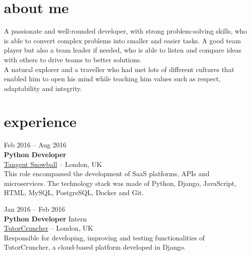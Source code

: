 \documentclass[]{friggeri-cv}
\begin{document}
\section{about me}
{
A passionate and well-rounded developer, with strong problem-solving skills, who is able to convert complex problems into smaller and easier tasks. A good team player but also a team leader if needed, who is able to listen and compare ideas with others to drive teams to better solutions.
\\
A natural explorer and a traveller who had met lots of different cultures that enabled him to open his mind while teaching him values such as respect, adaptability and integrity.}


\section{experience}

{Feb 2016 -- Aug 2016} \\
{\textbf{Python Developer}} \\
{\href{http://www.tangentsnowball.com}{Tangent Snowball}} -- {London, UK} \\
{This role encompassed the development of SaaS platforms, APIs and microservices.
The technology stack was made of Python, Django, JavaScript, HTML, MySQL, PostgreSQL, Docker and Git.}

{Jan 2016 -- Feb 2016} \\
{\textbf{Python Developer} Intern} \\
{\href{http://www.tutorcruncher.com}{TutorCruncher}} -- {London, UK} \\
{Responsible for developing, improving and testing functionalities of TutorCruncher, a cloud-based platform developed in Django.}
\end{document}
